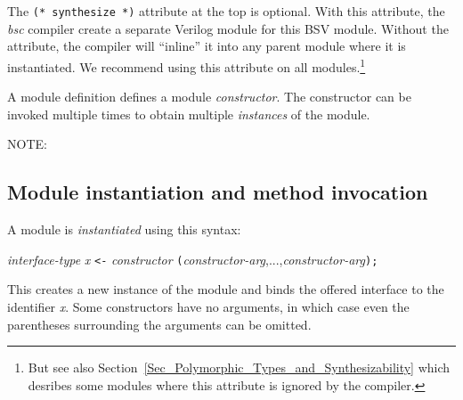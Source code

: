 
The \verb|(* synthesize *)| attribute at the top is optional.  With
this attribute, the \emph{bsc} compiler create a separate Verilog
module for this BSV module.  Without the attribute, the compiler will
``inline'' it into any parent module where it is instantiated.  We
recommend using this attribute on all modules.\footnote{But see also
Section~\ref{Sec_Polymorphic_Types_and_Synthesizability} which
desribes some modules where this attribute is ignored by the
compiler.}


A module definition defines a module \emph{constructor}. The
constructor can be invoked multiple times to obtain multiple
\emph{instances} of the module.

\vspace{2ex}

NOTE:


\subsection{Module instantiation and method invocation}


A module is \emph{instantiated} using this syntax:

\hm \emph{interface-type} \emph{x} {\tt <-} \emph{constructor} {\tt (}\emph{constructor-arg},...,\emph{constructor-arg}{\tt );}

This creates a new instance of the module and binds the offered
interface to the identifier \emph{x}.  Some constructors have no
arguments, in which case even the parentheses surrounding the
arguments can be omitted.

